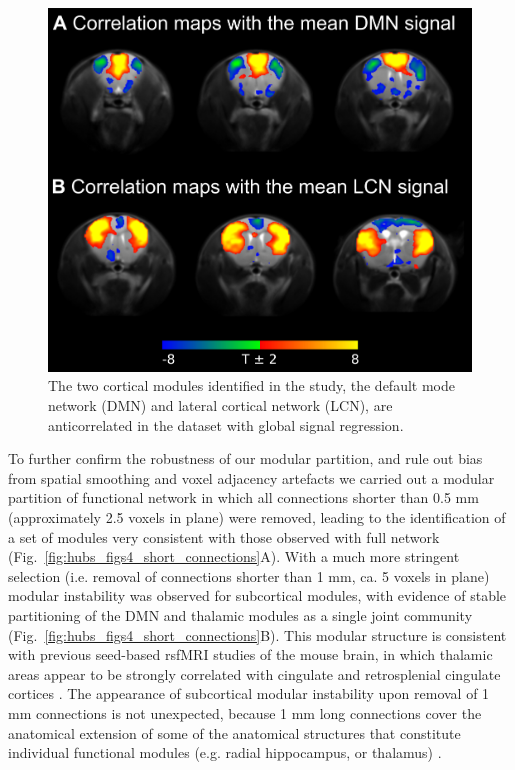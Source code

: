 \begin{figure}[th]
    \centering
    \includegraphics[scale=1]{figures/hubs_figure_s3_dmn_lcn_anticorr.png}
    \decoRule
    \caption[Anticorrelation between the time courses of the default mode and
    lateral cortical networks.]{The two cortical modules identified in the
    study, the default mode network (DMN) and lateral cortical network (LCN),
    are anticorrelated in the dataset with global signal regression.}
    \label{fig:hubs_figs3_anticorrelations}
\end{figure}

To further confirm the robustness of our modular partition, and rule out bias
from spatial smoothing and voxel adjacency artefacts \parencite{power2013} we
carried out a modular partition of functional network in which all connections
shorter than 0.5 mm (approximately 2.5 voxels in plane) were removed, leading to
the identification of a set of modules very consistent with those observed with
full network (Fig.~\ref{fig:hubs_figs4_short_connections}A). With a much more
stringent selection (i.e. removal of connections shorter than 1 mm, ca. 5 voxels
in plane) modular instability was observed for subcortical modules, with
evidence of stable partitioning of the DMN and thalamic modules as a single
joint community (Fig.~\ref{fig:hubs_figs4_short_connections}B). This modular structure is consistent with previous
seed-based rsfMRI studies of the mouse brain, in which thalamic areas appear to
be strongly correlated with cingulate and retrosplenial cingulate cortices
\parencite{sforazzini2016}. The appearance of subcortical modular instability
upon removal of 1 mm connections is not unexpected, because 1 mm long
connections cover the anatomical extension of some of the anatomical structures
that constitute individual functional modules (e.g.  radial hippocampus, or
thalamus) \parencite{paxinos2004}. 

